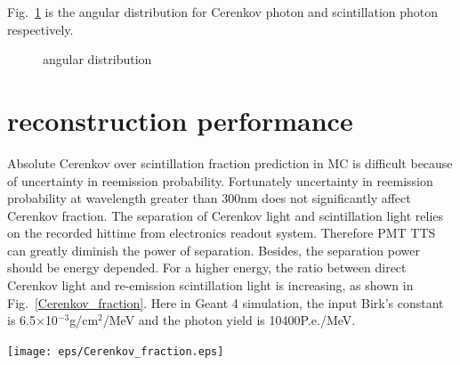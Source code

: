 \documentclass[a4paper,10pt]{cpc-hepnp}
\begin{document}
Fig.~\ref{fig_subfig} is the angular distribution
for Cerenkov photon and scintillation photon respectively.

\begin{figure}[htbp]
\centering
{}
\label{fig_subfig}
\caption{angular distribution}
\end{figure}




\section{reconstruction performance}
Absolute Cerenkov over scintillation fraction prediction in MC is difficult 
because of uncertainty in reemission probability. Fortunately uncertainty
in reemission probability at wavelength greater than 300nm does not
significantly affect Cerenkov fraction\cite{DocDB9847}. The separation
of Cerenkov light and scintillation light relies on the recorded hittime
from electronics readout system. Therefore PMT TTS can greatly diminish
the power of separation. Besides, the separation power should be energy
depended. For a higher energy, the ratio between direct Cerenkov light
and re-emission scintillation light is increasing, as shown in
Fig.~\ref{Cerenkov_fraction}. Here in Geant 4 simulation, the input
Birk's constant is 6.5$\times$10$^{-3}$g/cm$^{2}$/MeV and the photon yield
is 10400P.e./MeV.
\begin{center}
\texttt{[image: eps/Cerenkov\_fraction.eps]}
\end{center}
\end{document}
